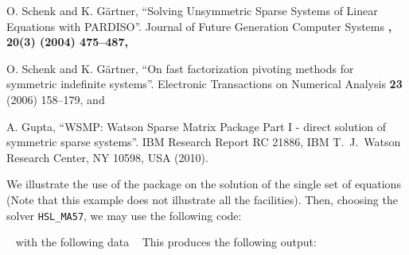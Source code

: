 \documentclass{galahad}
\begin{document}
\noindent
O. Schenk and K. G\"{a}rtner,
``Solving Unsymmetric Sparse Systems of Linear Equations with PARDISO''.
Journal of Future Generation Computer Systems \bf, 20(3) \rm (2004) 475--487, 

\noindent
O. Schenk and K. G\"{a}rtner,
``On fast factorization pivoting methods for symmetric indefinite systems''.
Electronic Transactions on Numerical Analysis
{\bf 23} (2006) 158--179,
and

\noindent
A. Gupta,
``WSMP: Watson Sparse Matrix Package Part I - direct
solution of symmetric sparse systems''.
IBM Research Report RC 21886, IBM T.\ J.\ Watson Research Center,
NY 10598, USA (2010).



\galexample
We illustrate the use of the package on the solution of the
single set of equations
(Note that this example does not illustrate all the facilities).
Then, choosing the solver {\tt HSL\_MA57}, we may use the following code:

{\tt \small
\VerbatimInput{\packageexample}
}
\noindent
with the following data
{\tt \small
\VerbatimInput{\packagedata}
}
\noindent
This produces the following output:
{\tt \small
\VerbatimInput{\packageresults}
}
\noindent
\end{document}
